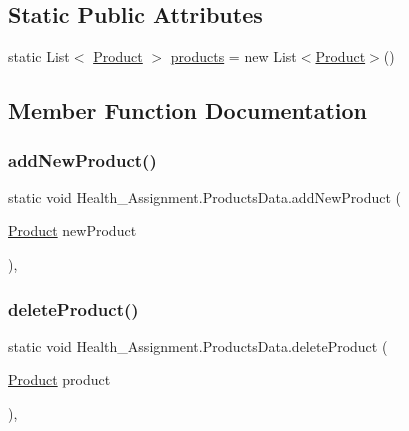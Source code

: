 \subsection*{Static Public Attributes}
\begin{DoxyCompactItemize}
\item 
static List$<$ \hyperlink{class_health___assignment_1_1_product}{Product} $>$ \hyperlink{class_health___assignment_1_1_products_data_a85fc48a6b266af5838f5950b48178166}{products} = new List$<$\hyperlink{class_health___assignment_1_1_product}{Product}$>$()
\end{DoxyCompactItemize}


\subsection{Member Function Documentation}
\mbox{\label{class_health___assignment_1_1_products_data_a82d7473f935b4c1e60abe8738c14653a}} 
\subsubsection{\texorpdfstring{add\+New\+Product()}{addNewProduct()}}
{\footnotesize\ttfamily static void Health\+\_\+\+Assignment.\+Products\+Data.\+add\+New\+Product (\begin{DoxyParamCaption}\item[{\hyperlink{class_health___assignment_1_1_product}{Product}}]{new\+Product }\end{DoxyParamCaption})\hspace{0.3cm}{\ttfamily [inline]}, {\ttfamily [static]}}

\mbox{\label{class_health___assignment_1_1_products_data_ad59ae5cd4083b869b356308c1c423960}} 
\subsubsection{\texorpdfstring{delete\+Product()}{deleteProduct()}}
{\footnotesize\ttfamily static void Health\+\_\+\+Assignment.\+Products\+Data.\+delete\+Product (\begin{DoxyParamCaption}\item[{\hyperlink{class_health___assignment_1_1_product}{Product}}]{product }\end{DoxyParamCaption})\hspace{0.3cm}{\ttfamily [inline]}, {\ttfamily [static]}}

